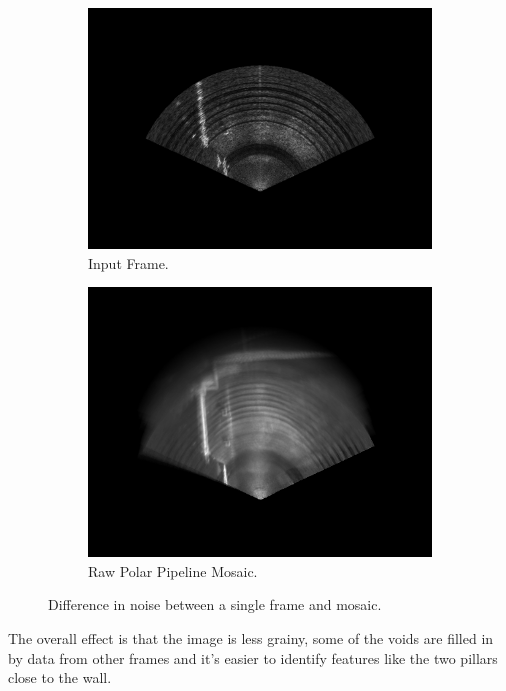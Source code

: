 \begin{figure}[H]
    \centering
    \begin{subfigure}[b]{0.47\textwidth}
        \centering
        \includegraphics[width=\textwidth]{figures/results/Real/ExampleMosaic/combined_00000001.png}
        \caption{Input Frame.}
    \end{subfigure}
    \hfill
    \begin{subfigure}[b]{0.47\textwidth}
        \centering
        \includegraphics[width=\textwidth]{figures/results/Real/ExampleMosaic/combined.png}
        \caption{Raw Polar Pipeline Mosaic.}
    \end{subfigure}
    \caption{Difference in noise between a single frame and mosaic.}
    \label{fig:sonar-mosaic}
\end{figure}

The overall effect is that the image is less grainy, some of the voids are filled in by data from other frames and it's easier to identify features like the two pillars close to the wall. 